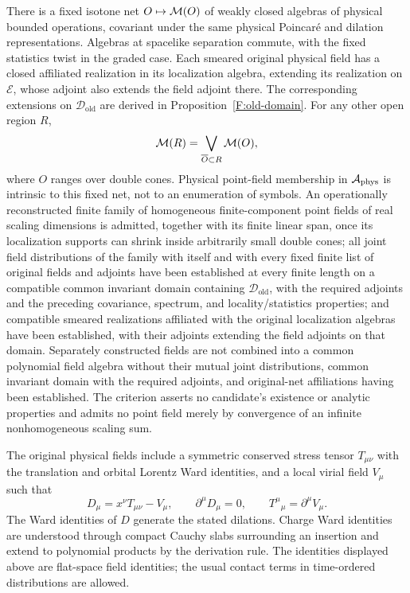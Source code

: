 \begin{assumption}
There is a fixed isotone net $O\mapsto\mathcal M(O)$ of weakly closed
algebras of physical bounded operations, covariant under the same
physical Poincar\'e and dilation representations. Algebras at spacelike separation
commute, with the fixed statistics twist in the graded case. Each smeared
original physical field has a closed affiliated realization in its localization
algebra, extending its realization on $\mathcal E$, whose adjoint also
extends the field adjoint there. The
corresponding extensions on $\mathcal D_{\mathrm{old}}$ are derived in
Proposition~\ref{F:old-domain}.
For any other open region $R$,
\[
 \mathcal M(R)=\bigvee_{\overline O\subset R}\mathcal M(O),
\]
where $O$ ranges over double cones. Physical point-field membership in
$\mathcal A_{\mathrm{phys}}$ is intrinsic to this fixed net, not to an enumeration of symbols.
An operationally reconstructed finite family of homogeneous
finite-component point fields of real scaling dimensions is admitted,
together with its finite linear span, once its localization supports can
shrink inside arbitrarily small double cones; all joint field distributions
of the family with itself and with every fixed finite list of original
fields and adjoints have been established at every finite length on a
compatible common invariant domain containing $\mathcal D_{\mathrm{old}}$,
with the required adjoints and the preceding covariance, spectrum, and
locality/statistics properties; and compatible smeared realizations
affiliated with the original localization algebras have been established,
with their adjoints extending the field adjoints on that domain. Separately
constructed fields are not combined into a common polynomial field algebra
without their mutual joint distributions, common invariant domain with the
required adjoints, and original-net affiliations having been established.
The criterion asserts no candidate's existence or analytic properties and
admits no point field merely by convergence of an infinite nonhomogeneous
scaling sum.

The original physical fields include a symmetric conserved stress tensor
$T_{\mu\nu}$ with the translation and orbital Lorentz Ward identities,
and a local virial field $V_\mu$ such that
\[
 D_\mu=x^\nu T_{\mu\nu}-V_\mu,\qquad
 \partial^\mu D_\mu=0,\qquad
 T^\mu{}_{\mu}=\partial^\mu V_\mu.
\]
The Ward identities of $D$ generate the stated dilations. Charge Ward
identities are understood through compact Cauchy slabs surrounding an
insertion and extend to polynomial products by the derivation rule.
The identities displayed above are flat-space field identities; the
usual contact terms in time-ordered distributions are allowed.
\end{assumption}

